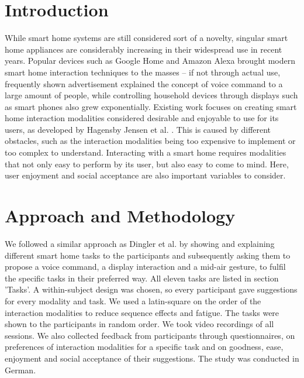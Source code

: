 \documentclass[sigchi]{acmart}
\begin{document}
	
	
	
	
	\maketitle
	
	\section{Introduction}
	While smart home systems are still considered sort of a novelty, singular smart home appliances are considerably increasing in their widespread use in recent years. Popular devices such as Google Home and Amazon Alexa brought modern smart home interaction techniques to the masses – if not through actual use, frequently shown advertisement explained the concept of voice command to a large amount of people, while controlling household devices through displays such as smart phones also grew exponentially. 
	Existing work focuses on creating smart home interaction modalities considered desirable and enjoyable to use for its users, as developed by Hagensby Jensen et al. \cite{Jensen.2018}.  This is caused by different obstacles, such as the interaction modalities being too expensive to implement or too complex to understand. Interacting with a smart home requires modalities that not only easy to perform by its user, but also easy to come to mind. Here, user enjoyment and social acceptance are also important variables to consider. 

	
	\section{Approach and Methodology}
	We followed a similar approach as Dingler et al. \cite{Dingler.2018} by showing and explaining different smart home tasks to the participants and subsequently asking them to propose a voice command, a display interaction and a mid-air gesture, to fulfil the specific tasks in their preferred way. All eleven tasks are listed in section 'Tasks'. A within-subject design was chosen, so every participant gave suggestions for every modality and task. We used a latin-square on the order of the interaction modalities to reduce sequence effects \cite{.2017} and fatigue. The tasks were shown to the participants in  random order. We took video recordings of all sessions. We also collected feedback from participants through questionnaires, on preferences of interaction modalities for a specific task and on goodness, ease, enjoyment and social acceptance of their suggestions. The study was conducted in German.
	
\end{document}
